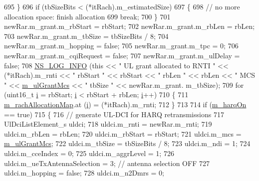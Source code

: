 \begin{DoxyCode}
695         \}
696       \textcolor{keywordflow}{if} (tbSizeBits < (*itRach).m\_estimatedSize)
697         \{
698           \textcolor{comment}{// no more allocation space: finish allocation}
699           \textcolor{keywordflow}{break};
700         \}
701       newRar.m\_grant.m\_rbStart = rbStart;
702       newRar.m\_grant.m\_rbLen = rbLen;
703       newRar.m\_grant.m\_tbSize = tbSizeBits / 8;
704       newRar.m\_grant.m\_hopping = \textcolor{keyword}{false};
705       newRar.m\_grant.m\_tpc = 0;
706       newRar.m\_grant.m\_cqiRequest = \textcolor{keyword}{false};
707       newRar.m\_grant.m\_ulDelay = \textcolor{keyword}{false};
708       \hyperlink{group__logging_gafbd73ee2cf9f26b319f49086d8e860fb}{NS\_LOG\_INFO} (\textcolor{keyword}{this} << \textcolor{stringliteral}{" UL grant allocated to RNTI "} << (*itRach).m\_rnti << \textcolor{stringliteral}{" rbStart "} << 
      rbStart << \textcolor{stringliteral}{" rbLen "} << rbLen << \textcolor{stringliteral}{" MCS "} << \hyperlink{classns3_1_1FdBetFfMacScheduler_ae614305b8694d0ad588967a9fb653870}{m\_ulGrantMcs} << \textcolor{stringliteral}{" tbSize "} << newRar.m\_grant.
      m\_tbSize);
709       \textcolor{keywordflow}{for} (uint16\_t \hyperlink{bernuolliDistribution_8m_a6f6ccfcf58b31cb6412107d9d5281426}{i} = rbStart; \hyperlink{bernuolliDistribution_8m_a6f6ccfcf58b31cb6412107d9d5281426}{i} < rbStart + rbLen; \hyperlink{bernuolliDistribution_8m_a6f6ccfcf58b31cb6412107d9d5281426}{i}++)
710         \{
711           \hyperlink{classns3_1_1FdBetFfMacScheduler_ac11ac1d239d1b52e4d7778b6265050f8}{m\_rachAllocationMap}.at (\hyperlink{bernuolliDistribution_8m_a6f6ccfcf58b31cb6412107d9d5281426}{i}) = (*itRach).m\_rnti;
712         \}
713 
714       \textcolor{keywordflow}{if} (\hyperlink{classns3_1_1FdBetFfMacScheduler_a37792b61da166e932f6697569d19a479}{m\_harqOn} == \textcolor{keyword}{true})
715         \{
716           \textcolor{comment}{// generate UL-DCI for HARQ retransmissions}
717           UlDciListElement\_s uldci;
718           uldci.m\_rnti = newRar.m\_rnti;
719           uldci.m\_rbLen = rbLen;
720           uldci.m\_rbStart = rbStart;
721           uldci.m\_mcs = \hyperlink{classns3_1_1FdBetFfMacScheduler_ae614305b8694d0ad588967a9fb653870}{m\_ulGrantMcs};
722           uldci.m\_tbSize = tbSizeBits / 8;
723           uldci.m\_ndi = 1;
724           uldci.m\_cceIndex = 0;
725           uldci.m\_aggrLevel = 1;
726           uldci.m\_ueTxAntennaSelection = 3; \textcolor{comment}{// antenna selection OFF}
727           uldci.m\_hopping = \textcolor{keyword}{false};
728           uldci.m\_n2Dmrs = 0;

\end{DoxyCode}
